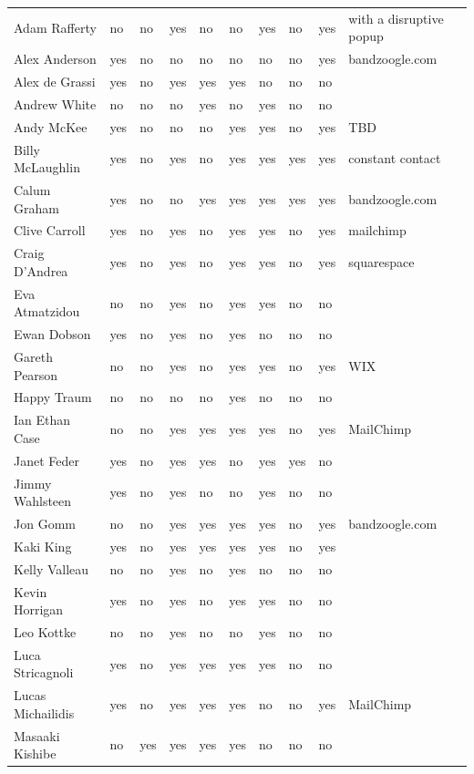 \documentclass[unicode,hyperfootnotes=false,xetex,colorlinks=true,nofonts,nobib]{tufte-handout}
\begin{document}
\begin{longtable}{l p{} l l l l l p{} l p{}}
  Adam Rafferty & no & no & yes & no & no & yes & no & yes & with a disruptive popup\\
  Alex Anderson & yes & no & no & no & no & no & no & yes & bandzoogle.com\\
  Alex de Grassi & yes & no & yes & yes & yes & no & no & no & \\
  Andrew White & no & no & no & yes & no & yes & no & no & \\
  Andy McKee & yes & no & no & no & yes & yes & no & yes & TBD\\
  Billy McLaughlin & yes & no & yes & no & yes & yes & yes & yes & constant contact\\
  Calum Graham & yes & no & no & yes & yes & yes & yes & yes & bandzoogle.com\\
  Clive Carroll & yes & no & yes & no & yes & yes & no & yes & mailchimp\\
  Craig D'Andrea & yes & no & yes & no & yes & yes & no & yes & squarespace\\
  Eva Atmatzidou & no & no & yes & no & yes & yes & no & no & \\
  Ewan Dobson & yes & no & yes & no & yes & no & no & no & \\
  Gareth Pearson & no & no & yes & no & yes & yes & no & yes & WIX\\
  Happy Traum & no & no & no & no & yes & no & no & no & \\
  Ian Ethan Case & no & no & yes & yes & yes & yes & no & yes & MailChimp\\
  Janet Feder & yes & no & yes & yes & no & yes & yes & no & \\
  Jimmy Wahlsteen & yes & no & yes & no & no & yes & no & no & \\
  Jon Gomm & no & no & yes & yes & yes & yes & no & yes & bandzoogle.com\\
  Kaki King & yes & no & yes & yes & yes & yes & no & yes & \\
  Kelly Valleau & no & no & yes & no & yes & no & no & no & \\
  Kevin Horrigan & yes & no & yes & no & yes & yes & no & no & \\
  Leo Kottke & no & no & yes & no & no & yes & no & no & \\
  Luca Stricagnoli & yes & no & yes & yes & yes & yes & no & no & \\
  Lucas Michailidis & yes & no & yes & yes & yes & no & no & yes & MailChimp \\
  Masaaki Kishibe & no & yes & yes & yes & yes & no & no & no & \\

\end{longtable}
\end{document}
